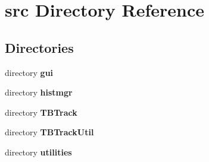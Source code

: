 \section{src Directory Reference}
\label{dir_54cc96177f479d1da214f2f49b97f4f8}
\subsection*{Directories}
\begin{DoxyCompactItemize}
\item 
directory {\bf gui}
\item 
directory {\bf histmgr}
\item 
directory {\bf T\-B\-Track}
\item 
directory {\bf T\-B\-Track\-Util}
\item 
directory {\bf utilities}
\end{DoxyCompactItemize}
